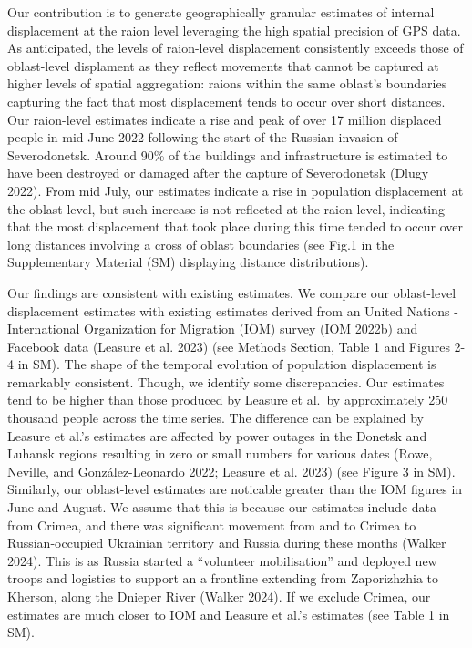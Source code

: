 \documentclass[
  sn-nature,
  11pt,
]{sn-jnl}
\begin{document}
Our contribution is to generate geographically granular estimates of
internal displacement at the raion level leveraging the high spatial
precision of GPS data. As anticipated, the levels of raion-level
displacement consistently exceeds those of oblast-level displament as
they reflect movements that cannot be captured at higher levels of
spatial aggregation: raions within the same oblast's boundaries
capturing the fact that most displacement tends to occur over short
distances. Our raion-level estimates indicate a rise and peak of over 17
million displaced people in mid June 2022 following the start of the
Russian invasion of Severodonetsk. Around 90\% of the buildings and
infrastructure is estimated to have been destroyed or damaged after the
capture of Severodonetsk (Dlugy 2022). From mid July, our estimates
indicate a rise in population displacement at the oblast level, but such
increase is not reflected at the raion level, indicating that the most
displacement that took place during this time tended to occur over long
distances involving a cross of oblast boundaries (see Fig.1 in the
Supplementary Material (SM) displaying distance distributions).

Our findings are consistent with existing estimates. We compare our
oblast-level displacement estimates with existing estimates derived from
an United Nations - International Organization for Migration (IOM)
survey (IOM 2022b) and Facebook data (Leasure et al. 2023) (see Methods
Section, Table 1 and Figures 2-4 in SM). The shape of the temporal
evolution of population displacement is remarkably consistent. Though,
we identify some discrepancies. Our estimates tend to be higher than
those produced by Leasure et al.~by approximately 250 thousand people
across the time series. The difference can be explained by Leasure et
al.'s estimates are affected by power outages in the Donetsk and Luhansk
regions resulting in zero or small numbers for various dates (Rowe,
Neville, and González-Leonardo 2022; Leasure et al. 2023) (see Figure 3
in SM). Similarly, our oblast-level estimates are noticable greater than
the IOM figures in June and August. We assume that this is because our
estimates include data from Crimea, and there was significant movement
from and to Crimea to Russian-occupied Ukrainian territory and Russia
during these months (Walker 2024). This is as Russia started a
``volunteer mobilisation'' and deployed new troops and logistics to
support an a frontline extending from Zaporizhzhia to Kherson, along the
Dnieper River (Walker 2024). If we exclude Crimea, our estimates are
much closer to IOM and Leasure et al.'s estimates (see Table 1 in SM).
\end{document}
